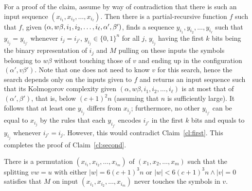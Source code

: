 \documentclass{LMCS}
\theoremstyle{plain}\newtheorem{athm}[thm]{Theorem}
\theoremstyle{plain}\newtheorem{aprop}[thm]{Proposition}
\theoremstyle{plain}\newtheorem{aprob}[thm]{Open Problem}
\theoremstyle{plain}\newtheorem{acor}[thm]{Corollary}
\theoremstyle{plain}\newtheorem{alem}[thm]{Lemma}
\theoremstyle{definition}\newtheorem{adefn}[thm]{Definition}
\theoremstyle{definition}\newtheorem{arem}[thm]{Remark}
\theoremstyle{plain}\newtheorem{aexmp}[thm]{Example}
\theoremstyle{plain}\newtheorem{aclm}[thm]{Claim}
\begin{document}
\noindent
For a proof of the claim,
assume by way of contradiction that there is such an input sequence 
$(x_{i_1},x_{i_2},\ldots,x_{i_{\ell}})$.
Then there is a partial-recursive
function $f$ such that $f$, given 
$(\alpha,w\beta,i_1,i_2,\ldots,\linebreak[3]
i_\ell,\alpha',\beta')$, finds a sequence
$y_{i_1},y_{i_2},\ldots,y_{i_\ell}$ such that $y_{i_j} = y_{i_{j'}}$ whenever
$i_j = i_{j'}$, $y_{i_j} \in \{0,1\}^n$ for all $j$, $y_{i_j}$ having
the first $k$ bits being the binary representation of $i_j$ and
$M$ pulling on these inputs the symbols belonging to $w\beta$ without
touching those of $v$ and ending up in the configuration $(\alpha',v\beta')$.
Note that one does not need to know $v$ for this search, hence the
search depends only on the inputs given to $f$ and returns an input
sequence such that its Kolmogorov complexity 
given
$(\alpha,w\beta,i_1,i_2,\ldots,i_\ell)$ is at 
most that of $(\alpha',\beta')$, that
is, below $(c+1)^2n$ (assuming that $n$ is sufficiently large).
It follows that at least one $y_{i_j}$ differs from $x_{i_j}$;
furthermore, no other $y_{i_{j'}}$ can be equal to $x_{i_j}$
by the rules that each $y_{i_{j'}}$ encodes $i_{j'}$ in the
first $k$ bits and equals to $y_{i_j}$ whenever $i_{j'} = i_j$.
However, this would contradict Claim~\ref{cl:first}.
This completes the proof of
Claim~\ref{cl:second}.

\begin{clm} \label{cl:third}
There is a permutation $(x_{i_1},x_{i_2},\ldots,x_{i_m})$ of
$(x_1,x_2,\ldots,x_m)$ such that the splitting $vw = u$ with
either $|w|=6(c+1)^3n$ or $|w|<6(c+1)^3n \wedge |v|=0$
satisfies that $M$ on input $(x_{i_1},x_{i_2},\ldots,x_{i_m})$
never touches the symbols in $v$.
\end{clm}
\end{document}
